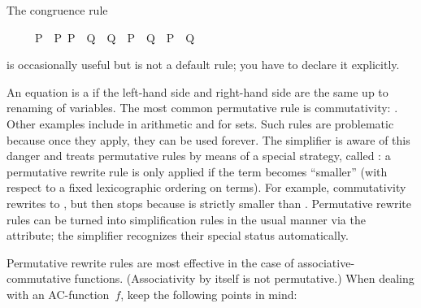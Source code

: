 \begin{isabellebody}
\begin{isamarkuptext}
\begin{warn}
The congruence rule 
\begin{isabelle}%
\ \ \ \ \ {\isasymlbrakk}P\ {\isacharequal}\ P{\isacharprime}{\isacharsemicolon}\ P{\isacharprime}\ {\isasymLongrightarrow}\ Q\ {\isacharequal}\ Q{\isacharprime}{\isasymrbrakk}\ {\isasymLongrightarrow}\ {\isacharparenleft}P\ {\isasymand}\ Q{\isacharparenright}\ {\isacharequal}\ {\isacharparenleft}P{\isacharprime}\ {\isasymand}\ Q{\isacharprime}{\isacharparenright}%
\end{isabelle}
\par\noindent
is occasionally useful but is not a default rule; you have to declare it explicitly.
\end{warn}%
\end{isamarkuptext}%
%
%
\begin{isamarkuptext}%
An equation is a  if the left-hand
side and right-hand side are the same up to renaming of variables.  The most
common permutative rule is commutativity: .  Other examples
include  in arithmetic and  for sets. Such rules are problematic because
once they apply, they can be used forever. The simplifier is aware of this
danger and treats permutative rules by means of a special strategy, called
: a permutative rewrite
rule is only applied if the term becomes ``smaller'' (with respect to a fixed
lexicographic ordering on terms). For example, commutativity rewrites
 to , but then stops because  is strictly
smaller than .  Permutative rewrite rules can be turned into
simplification rules in the usual manner via the  attribute; the
simplifier recognizes their special status automatically.

Permutative rewrite rules are most effective in the case of
associative-commutative functions.  (Associativity by itself is not
permutative.)  When dealing with an AC-function~$f$, keep the
following points in mind:
\begin{itemize}
  

\end{itemize}
\end{isamarkuptext}
\end{isabellebody}
